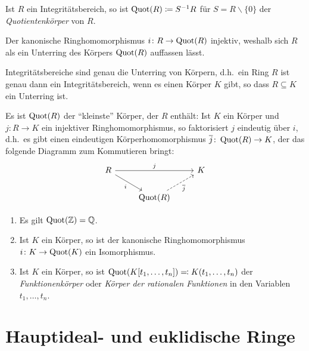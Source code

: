 \begin{definition}
  Ist $R$ ein Integritätsbereich, so ist $\operatorname{Quot}(R) \coloneqq S^{-1} R$ für $S = R \smallsetminus \{0\}$ der \emph{Quotientenkörper} von $R$.
\end{definition}

Der kanonische Ringhomomorphismus $i \colon R \to \operatorname{Quot}(R)$ injektiv, weshalb sich $R$ als ein Unterring des Körpers $\operatorname{Quot}(R)$ auffassen lässt.

\begin{corollary}
  Integritätsbereiche sind genau die Unterring von Körpern, d.h.\ ein Ring $R$ ist genau dann ein Integritätsbereich, wenn es einen Körper $K$ gibt, so dass $R \subseteq K$ ein Unterring ist.
\end{corollary}

Es ist $\operatorname{Quot}(R)$ der \enquote{kleinste} Körper, der $R$ enthält:
Ist $K$ ein Körper und $j \colon R \to K$ ein injektiver Ringhomomorphismus, so faktorisiert $j$ eindeutig über $i$, d.h.\ es gibt einen eindeutigen Körperhomomorphismus $\overline{j} \colon \operatorname{Quot}(R) \to K$, der das folgende Diagramm zum Kommutieren bringt:
\[
  \begin{tikzcd}
      R
      \arrow{rr}[above]{j}
      \arrow{dr}[below left]{i}
    & {}
    & K
    \\
      {}
    & \Quot{R}
      \arrow[dashed]{ur}[below right]{\induced{j}}
    & {}
  \end{tikzcd}
\]

\begin{example}
  \begin{enumerate}
    \item
      Es gilt $\operatorname{Quot}(\mathbb{Z}) = \mathbb{Q}$.
    \item
      Ist $K$ ein Körper, so ist der kanonische Ringhomomorphismus $i \colon K \to \operatorname{Quot}(K)$ ein Isomorphismus.
    \item
      Ist $K$ ein Körper, so ist $\operatorname{Quot}(K[t_1, \dotsc, t_n]) \eqqcolon K(t_1, \dotsc, t_n)$ der \emph{Funktionenkörper} oder \emph{Körper der rationalen Funktionen} in den Variablen $t_1, \dotsc, t_n$.
  \end{enumerate}
\end{example}





\section{Hauptideal- und euklidische Ringe}

